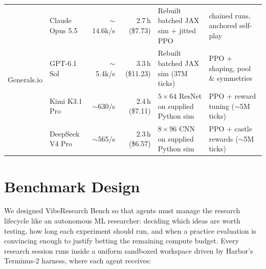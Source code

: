 \documentclass[11pt,letterpaper]{article}
\begin{document}
\begin{table}[htbp]
\begin{tabularx}{\textwidth}{@{}llrr>{\raggedright\arraybackslash}p{3.65cm}>{\raggedright\arraybackslash}X@{}}
\midrule
\multirow{4}{*}{Generals.io}
  & Claude Opus 5.5      & $\sim$14.6k/s & 2.7\,h (\$7.73) & Rebuilt batched JAX sim + jitted PPO & 7 chained runs, anchored self-play \\
  & GPT-6.1 Sol          & $\sim$5.4k/s  & 3.3\,h (\$11.23) & Rebuilt batched JAX sim (37M ticks) & PPO + shaping, pool \& symmetries \\
  & Kimi K3.1 Pro        & $\sim$630/s   & 2.4\,h (\$7.11)  & $5{\times}64$ ResNet on supplied Python sim & PPO + reward tuning ($\sim$5M ticks) \\
  & DeepSeek V4 Pro      & $\sim$565/s   & 2.3\,h (\$6.57)  & $8{\times}96$ CNN on supplied Python sim & PPO + castle rewards ($\sim$5M ticks) \\
\bottomrule
\end{tabularx}
\end{table}

\section{Benchmark Design}
\label{sec:design}

We designed VibeResearch Bench so that agents must manage the research lifecycle like an autonomous ML researcher: deciding which ideas are worth testing, how long each experiment should run, and when a practice evaluation is convincing enough to justify betting the remaining compute budget. Every research session runs inside a uniform sandboxed workspace driven by Harbor's Terminus-2 harness, where each agent receives:
\end{document}

